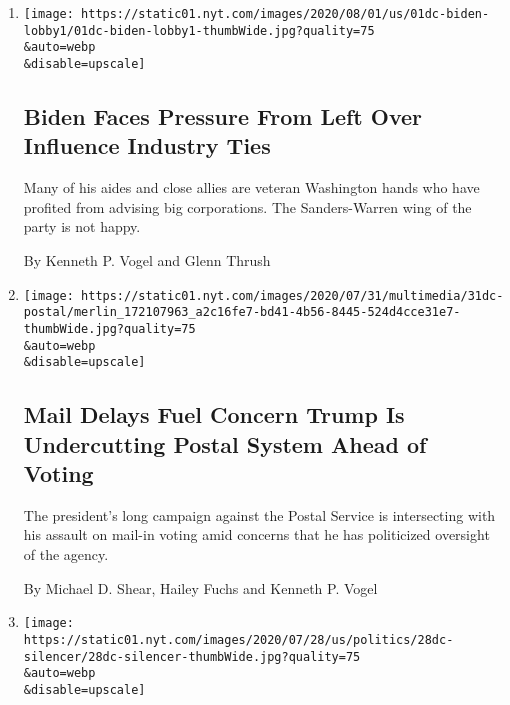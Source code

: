 \begin{enumerate}
\def\labelenumi{\arabic{enumi}.}
\item
  \href{/2020/08/01/us/politics/biden-lobbyist-ties.html}{}

  \texttt{[image: https://static01.nyt.com/images/2020/08/01/us/01dc-biden-lobby1/01dc-biden-lobby1-thumbWide.jpg?quality=75\\\&auto=webp\\\&disable=upscale]}

  \hypertarget{biden-faces-pressure-from-left-over-influence-industry-ties}{%
  \subsection{Biden Faces Pressure From Left Over Influence Industry
  Ties}\label{biden-faces-pressure-from-left-over-influence-industry-ties}}

  Many of his aides and close allies are veteran Washington hands who
  have profited from advising big corporations. The Sanders-Warren wing
  of the party is not happy.

  By Kenneth P. Vogel and Glenn Thrush
\item
  \href{/2020/07/31/us/politics/trump-usps-mail-delays.html}{}

  \texttt{[image: https://static01.nyt.com/images/2020/07/31/multimedia/31dc-postal/merlin\_172107963\_a2c16fe7-bd41-4b56-8445-524d4cce31e7-thumbWide.jpg?quality=75\\\&auto=webp\\\&disable=upscale]}

  \hypertarget{mail-delays-fuel-concern-trump-is-undercutting-postal-system-ahead-of-voting}{%
  \subsection{Mail Delays Fuel Concern Trump Is Undercutting Postal
  System Ahead of
  Voting}\label{mail-delays-fuel-concern-trump-is-undercutting-postal-system-ahead-of-voting}}

  The president's long campaign against the Postal Service is
  intersecting with his assault on mail-in voting amid concerns that he
  has politicized oversight of the agency.

  By Michael D. Shear, Hailey Fuchs and Kenneth P. Vogel
\item
  \href{/2020/07/28/us/politics/gun-silencers-democrats-trump.html}{}

  \texttt{[image: https://static01.nyt.com/images/2020/07/28/us/politics/28dc-silencer/28dc-silencer-thumbWide.jpg?quality=75\\\&auto=webp\\\&disable=upscale]}

  \hypertarget{democrats-investigating-why-white-house-ended-ban-on-some-gun-silencer-sales}{%
}
\end{enumerate}
